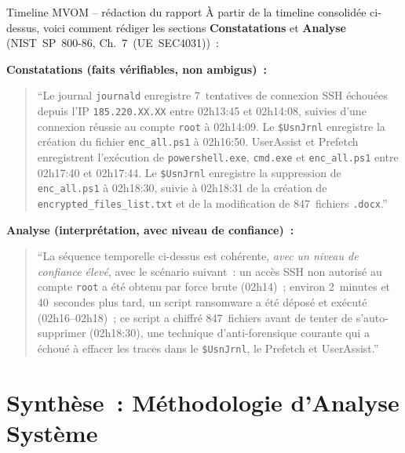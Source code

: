 \begin{boxscenario}{Timeline MVOM -- rédaction du rapport}
À partir de la timeline consolidée ci-dessus, voici comment rédiger
les sections \textbf{Constatations} et \textbf{Analyse} (NIST~SP~800-86,
Ch.~7~(UE~SEC4031))~:

\textbf{Constatations (faits vérifiables, non ambigus)~:}
\begin{quote}
``Le journal \texttt{journald} enregistre 7~tentatives de connexion
SSH échouées depuis l'IP \texttt{185.220.XX.XX} entre 02h13:45 et
02h14:08, suivies d'une connexion réussie au compte \texttt{root}
à 02h14:09. Le \texttt{\$UsnJrnl} enregistre la création du fichier
\texttt{enc\_all.ps1} à 02h16:50. UserAssist et Prefetch enregistrent
l'exécution de \texttt{powershell.exe}, \texttt{cmd.exe} et
\texttt{enc\_all.ps1} entre 02h17:40 et 02h17:44. Le \texttt{\$UsnJrnl}
enregistre la suppression de \texttt{enc\_all.ps1} à 02h18:30, suivie
à 02h18:31 de la création de \texttt{encrypted\_files\_list.txt} et
de la modification de 847~fichiers \texttt{.docx}.''
\end{quote}

\textbf{Analyse (interprétation, avec niveau de confiance)~:}
\begin{quote}
``La séquence temporelle ci-dessus est cohérente, \emph{avec un niveau
de confiance élevé}, avec le scénario suivant~: un accès SSH non
autorisé au compte \texttt{root} a été obtenu par force brute
(02h14)~; environ 2~minutes et 40~secondes plus tard, un script
ransomware a été déposé et exécuté (02h16--02h18)~; ce script a
chiffré 847~fichiers avant de tenter de s'auto-supprimer
(02h18:30), une technique d'anti-forensique courante qui a
échoué à effacer les traces dans le \texttt{\$UsnJrnl}, le
Prefetch et UserAssist.''
\end{quote}
\end{boxscenario}

\section{Synthèse~: Méthodologie d'Analyse Système}
\label{sec:synthese-for-sys}

